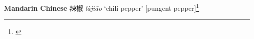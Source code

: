 \begin{etymology}\label{ety:lajiao}
\textbf{Mandarin Chinese} {辣椒} \textit{làjiāo} `chili pepper' [pungent-pepper]\footnote{\textcite{defrancis_abc_2003}}
\end{etymology}